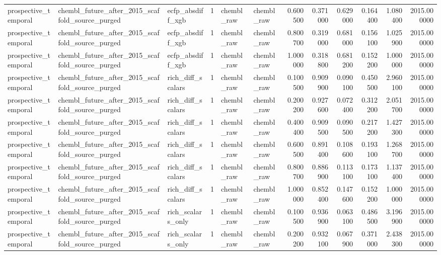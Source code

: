 \begin{longtable}{lllrllrrrrrr}
prospective\_temporal & chembl\_future\_after\_2015\_scaffold\_source\_purged & ecfp\_absdiff\_xgb & 1 & chembl\_raw & chembl\_raw & 0.600500 & 0.371000 & 0.629000 & 0.164400 & 1.080400 & 2015.000000 \\
prospective\_temporal & chembl\_future\_after\_2015\_scaffold\_source\_purged & ecfp\_absdiff\_xgb & 1 & chembl\_raw & chembl\_raw & 0.800700 & 0.319000 & 0.681000 & 0.156100 & 1.025900 & 2015.000000 \\
prospective\_temporal & chembl\_future\_after\_2015\_scaffold\_source\_purged & ecfp\_absdiff\_xgb & 1 & chembl\_raw & chembl\_raw & 1.000000 & 0.318800 & 0.681200 & 0.152200 & 1.000000 & 2015.000000 \\
prospective\_temporal & chembl\_future\_after\_2015\_scaffold\_source\_purged & rich\_diff\_scalars & 1 & chembl\_raw & chembl\_raw & 0.100500 & 0.909900 & 0.090100 & 0.450500 & 2.960100 & 2015.000000 \\
prospective\_temporal & chembl\_future\_after\_2015\_scaffold\_source\_purged & rich\_diff\_scalars & 1 & chembl\_raw & chembl\_raw & 0.200200 & 0.927600 & 0.072400 & 0.312200 & 2.051700 & 2015.000000 \\
prospective\_temporal & chembl\_future\_after\_2015\_scaffold\_source\_purged & rich\_diff\_scalars & 1 & chembl\_raw & chembl\_raw & 0.400400 & 0.909500 & 0.090500 & 0.217200 & 1.427300 & 2015.000000 \\
prospective\_temporal & chembl\_future\_after\_2015\_scaffold\_source\_purged & rich\_diff\_scalars & 1 & chembl\_raw & chembl\_raw & 0.600500 & 0.891400 & 0.108600 & 0.193100 & 1.268700 & 2015.000000 \\
prospective\_temporal & chembl\_future\_after\_2015\_scaffold\_source\_purged & rich\_diff\_scalars & 1 & chembl\_raw & chembl\_raw & 0.800700 & 0.886900 & 0.113100 & 0.173100 & 1.137400 & 2015.000000 \\
prospective\_temporal & chembl\_future\_after\_2015\_scaffold\_source\_purged & rich\_diff\_scalars & 1 & chembl\_raw & chembl\_raw & 1.000000 & 0.852400 & 0.147600 & 0.152200 & 1.000000 & 2015.000000 \\
prospective\_temporal & chembl\_future\_after\_2015\_scaffold\_source\_purged & rich\_scalars\_only & 1 & chembl\_raw & chembl\_raw & 0.100500 & 0.936900 & 0.063100 & 0.486500 & 3.196900 & 2015.000000 \\
prospective\_temporal & chembl\_future\_after\_2015\_scaffold\_source\_purged & rich\_scalars\_only & 1 & chembl\_raw & chembl\_raw & 0.200200 & 0.932100 & 0.067900 & 0.371000 & 2.438300 & 2015.000000 \\

\end{longtable}
